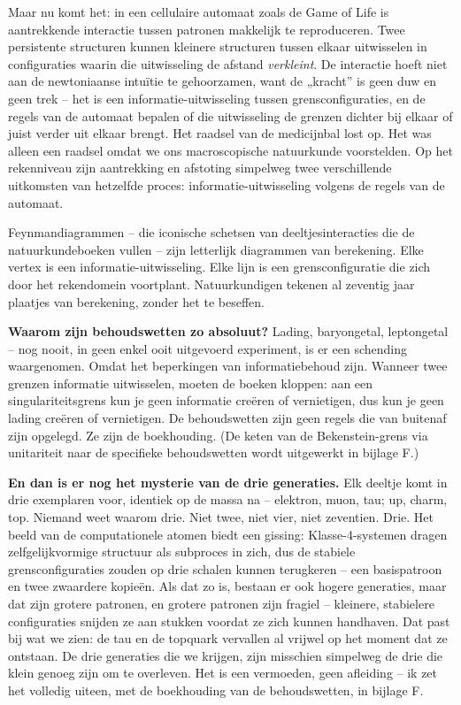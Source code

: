 \documentclass[11pt, twoside, openright]{book}
\begin{document}
Maar nu komt het: in een cellulaire automaat zoals de Game of Life is aantrekkende interactie tussen patronen makkelijk te reproduceren. Twee persistente structuren kunnen kleinere structuren tussen elkaar uitwisselen in configuraties waarin die uitwisseling de afstand \textit{verkleint}. De interactie hoeft niet aan de newtoniaanse intuïtie te gehoorzamen, want de „kracht” is geen duw en geen trek -- het is een informatie-uitwisseling tussen grensconfiguraties, en de regels van de automaat bepalen of die uitwisseling de grenzen dichter bij elkaar of juist verder uit elkaar brengt. Het raadsel van de medicijnbal lost op. Het was alleen een raadsel omdat we ons macroscopische natuurkunde voorstelden. Op het rekenniveau zijn aantrekking en afstoting simpelweg twee verschillende uitkomsten van hetzelfde proces: informatie-uitwisseling volgens de regels van de automaat.

Feynmandiagrammen -- die iconische schetsen van deeltjesinteracties die de natuurkundeboeken vullen -- zijn letterlijk diagrammen van berekening. Elke vertex is een informatie-uitwisseling. Elke lijn is een grensconfiguratie die zich door het rekendomein voortplant. Natuurkundigen tekenen al zeventig jaar plaatjes van berekening, zonder het te beseffen.

\textbf{Waarom zijn behoudswetten zo absoluut?} Lading, baryongetal, leptongetal -- nog nooit, in geen enkel ooit uitgevoerd experiment, is er een schending waargenomen. Omdat het beperkingen van informatiebehoud zijn. Wanneer twee grenzen informatie uitwisselen, moeten de boeken kloppen: aan een singulariteitsgrens kun je geen informatie creëren of vernietigen, dus kun je geen lading creëren of vernietigen. De behoudswetten zijn geen regels die van buitenaf zijn opgelegd. Ze zijn de boekhouding. (De keten van de Bekenstein-grens via unitariteit naar de specifieke behoudswetten wordt uitgewerkt in bijlage F.)

\textbf{En dan is er nog het mysterie van de drie generaties.} Elk deeltje komt in drie exemplaren voor, identiek op de massa na -- elektron, muon, tau; up, charm, top. Niemand weet waarom drie. Niet twee, niet vier, niet zeventien. Drie. Het beeld van de computationele atomen biedt een gissing: Klasse-4-systemen dragen zelfgelijkvormige structuur als subproces in zich, dus de stabiele grensconfiguraties zouden op drie schalen kunnen terugkeren -- een basispatroon en twee zwaardere kopieën. Als dat zo is, bestaan er ook hogere generaties, maar dat zijn grotere patronen, en grotere patronen zijn fragiel -- kleinere, stabielere configuraties snijden ze aan stukken voordat ze zich kunnen handhaven. Dat past bij wat we zien: de tau en de topquark vervallen al vrijwel op het moment dat ze ontstaan. De drie generaties die we krijgen, zijn misschien simpelweg de drie die klein genoeg zijn om te overleven. Het is een vermoeden, geen afleiding -- ik zet het volledig uiteen, met de boekhouding van de behoudswetten, in bijlage F.
\end{document}
